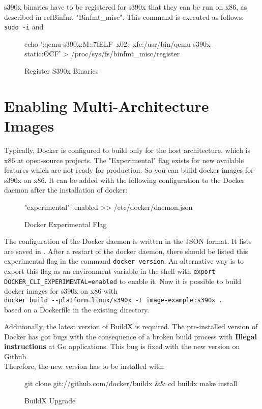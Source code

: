 s390x binaries have to be registered for s390x that they can be run on x86, as described in ref{Binfmt} "Binfmt\_misc". This command is executed as follows: \lstinline!sudo -i! and 
\begin{figure}[H]
\centering
\begin{boxedverbatim}
echo ':qemu-s390x:M::\x7fELF\
x02:\xff\xff\xff\xff\xff\xff\xff{}\xff\xff\xff\xff\xff\xff\xff\xff\xff\
xfe\xff\xff:/usr/bin/qemu-s390x-static:OCF' > /proc/sys/fs/binfmt_misc/register
\end{boxedverbatim}
 \caption{Register S390x Binaries}
    \label{RegisterS390xBinaries}
\end{figure}

\section{Enabling Multi-Architecture Images}\label{Multi-Architecture-Images}

Typically, Docker is configured to build only for the host architecture, which is x86 at open-source projects. The "Experimental" flag exists for new available features which are not ready for production. So you can build docker images for s390x on x86. It can be added with the following configuration to the Docker daemon after the installation of docker:
\begin{figure}[H]
\centering
\begin{boxedverbatim}
{
  "experimental": enabled
} >> /etc/docker/daemon.json
\end{boxedverbatim}
 \caption{Docker Experimental Flag}
    \label{DockerExperimentalFlag}
\end{figure}
The configuration of the Docker daemon is written in the JSON format. It lists are saved in .
After a restart of the docker daemon, there should be listed this experimental flag in the command  \lstinline!docker version!. An alternative way is to export this flag as an environment variable in the shell with  \lstinline!export DOCKER_CLI_EXPERIMENTAL=enabled! to enable it. Now it is possible to build docker images for s390x on x86 with \\ \lstinline!docker build --platform=linux/s390x -t image-example:s390x .! \\
based on a Dockerfile in the existing directory.

 
Additionally, the latest version of BuildX is required. The pre-installed version of Docker has got bugs with the consequence of a broken build process with \textbf{Illegal instructions} at Go applications. This bug is fixed with the new version on Github. \\
Therefore, the new version has to be installed with:
\begin{figure}[H]
\centering
\begin{boxedverbatim}
git clone git://github.com/docker/buildx && cd buildx
make install
\end{boxedverbatim}
 \caption{BuildX Upgrade}
    \label{BuildXUpgrade}
\end{figure}
 

